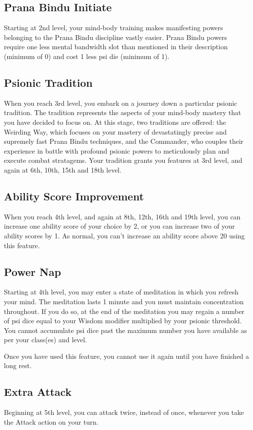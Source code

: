 \subsection{Prana Bindu Initiate}
Starting at 2nd level,
your mind-body training makes manifesting powers
belonging to the Prana Bindu discipline
vastly easier.
Prana Bindu powers require one less mental bandwidth slot
than mentioned in their description (minimum of 0)
and cost 1 less psi die (minimum of 1).

\subsection{Psionic Tradition}
When you reach 3rd level,
you embark on a journey down a particular
psionic tradition.
The tradition represents the aspects of
your mind-body mastery that you have decided
to focus on.
At this stage, two traditions are offered:
the Weirding Way, which focuses on your mastery
of devastatingly precise and supremely fast
Prana Bindu techniques,
and the Commander,
who couples their experience in battle
with profound psionic powers to meticulously
plan and execute combat stratagems.
Your tradition grants you features at 3rd level,
and again at 6th, 10th, 15th and 18th level.

\subsection{Ability Score Improvement}
When you reach 4th level,
and again at 8th, 12th, 16th and 19th level,
you can increase one ability score of your choice by 2,
or you can increase two of your ability scores by 1.
As normal,
you can't increase an ability score above 20 using this feature.

\subsection{Power Nap}
Starting at 4th level,
you may enter a state of meditation
in which you refresh your mind.
The meditation lasts 1 minute and
you must maintain concentration throughout.
If you do so,
at the end of the meditation you may regain a number of psi dice
equal to your Wisdom modifier multiplied by your psionic threshold.
You cannot accumulate psi dice past the maximum number you have available
as per your class(es) and level.

Once you have used this feature,
you cannot use it again until you have finished a long rest.

\subsection{Extra Attack}
Beginning at 5th level, you can attack twice,
instead of once,
whenever you take the Attack action on your turn.


